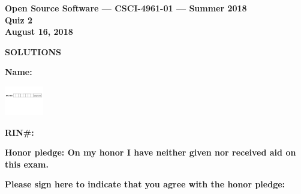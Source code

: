 \documentclass[10pt]{article}
\begin{document}
\thispagestyle{empty}

\vspace*{0.5in}

\begin{center}
\Large
\textbf{Open Source Software --- CSCI-4961-01 --- Summer 2018} \\
\textbf{Quiz 2} \\
\textbf{August 16, 2018}
\end{center}


\beginanswers
\begin{center}
\Large
\textbf{SOLUTIONS}
\end{center}

\else


\begin{center}

\textbf{\Large Name:} \underline {\hspace{2.0in}} \\

\bigskip
\bigskip

\centerline{
\includegraphics[height=0.5in]{boxes}
}


\bigskip

\textbf{\Large RIN\#:} \underline {\hspace{1.5in}}  

\vspace*{0.4in}
{\large\bf Honor pledge: On my honor I have neither given
nor received aid on this exam.}

\vspace*{0.1in}
{\large\bf Please sign here to indicate that you agree with the honor pledge: \underline {\hspace{1.5in}}}
\end{center}
\end{document}
